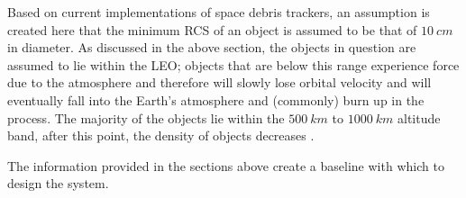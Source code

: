 \documentclass[11pt]{witseiepaper}
\begin{document}
\begin{bibunit}[witseie]
Based on current implementations of space debris trackers, an assumption is created here that the minimum RCS of an object is assumed to be that of $10~cm$ in diameter.
As discussed in the above section, the objects in question are assumed to lie within the LEO; objects that are below this range experience force due to the atmosphere and therefore will slowly lose orbital velocity and will eventually fall into the Earth's atmosphere and (commonly) burn up in the process.
The majority of the objects lie within the $500~km$ to $1000~km$ altitude band, after this point, the density of objects decreases \cite{ObjectInformation}.

The information provided in the sections above create a baseline with which to design the system.






\end{bibunit}
\end{document}
